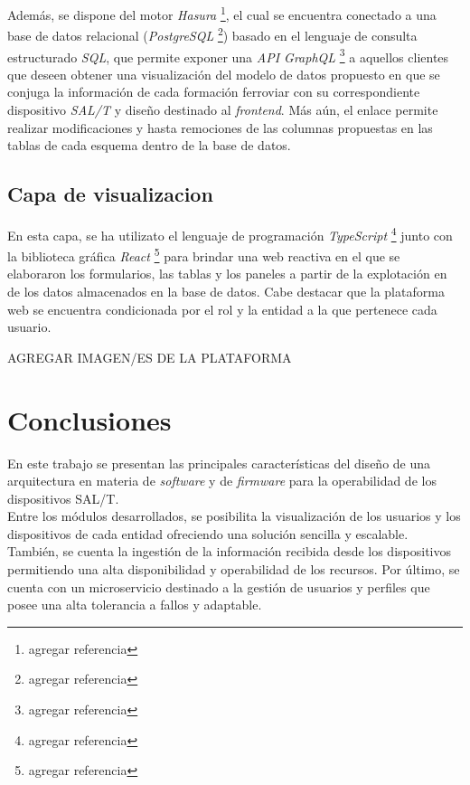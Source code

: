 \documentclass[a4paper]{IEEEtran}
\begin{document}
Además, se dispone del motor \textit{Hasura} \cite{b11} \footnote{agregar referencia}, el cual se encuentra conectado a una base de datos relacional (\textit{PostgreSQL} \cite{b12} \footnote{agregar referencia}) basado en el lenguaje de consulta estructurado \textit{SQL}, que permite exponer una \textit{API GraphQL} \cite{b13} \footnote{agregar referencia} a aquellos clientes que deseen obtener una visualización del modelo de datos propuesto en que se conjuga la información de cada formación ferroviar con su correspondiente dispositivo \textit{SAL/T} y diseño destinado al \textit{frontend}. Más aún, el enlace permite realizar modificaciones y hasta remociones de las columnas propuestas en las tablas de cada esquema dentro de la base de datos.


\subsection{Capa de visualizacion}

En esta capa, se ha utilizato el lenguaje de programación \textit{TypeScript} \cite{b14} \footnote{agregar referencia} junto con la biblioteca gráfica \textit{React} \cite{b15} \footnote{agregar referencia} para brindar una web reactiva en el que se elaboraron los formularios, las tablas y los paneles a partir de la explotación en de los datos almacenados en la base de datos. Cabe destacar que la plataforma web se encuentra condicionada por el rol y la entidad a la que pertenece cada usuario.


AGREGAR IMAGEN/ES DE LA PLATAFORMA


\section{Conclusiones}

En este trabajo se presentan las principales características del diseño de una arquitectura en materia de \textit{software} y de \textit{firmware} para la operabilidad de los dispositivos SAL/T.
\\

Entre los módulos desarrollados, se posibilita la visualización de los usuarios y los dispositivos de cada entidad ofreciendo una solución sencilla y escalable. También, se cuenta la ingestión de la información recibida desde los dispositivos permitiendo una alta disponibilidad y operabilidad de los recursos. Por último, se cuenta con un microservicio destinado a la gestión de usuarios y perfiles que posee una alta tolerancia a fallos y adaptable.
\\
\end{document}
